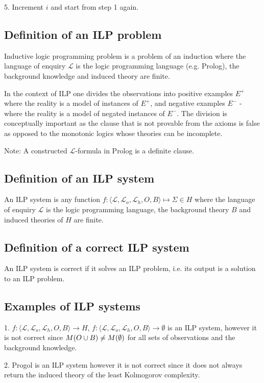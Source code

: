 5. Increment $i$ and start from step 1 again.

\subsection{Definition of an ILP problem}
Inductive logic programming problem is a problem of an induction where the language of enquiry $\mathcal{L}$ is the logic programming language (e.g. Prolog), the background knowledge and induced theory are finite.

In the context of ILP one divides the observations into positive examples $E^+$ where the reality is a model of instances of $E^+$, and negative examples $E^-$ - where the reality is a model of negated instances of $E^-$. The division is conceptually important as the clause that is not provable from the axioms is false as opposed to the monotonic logics whose theories can be incomplete.

Note: A constructed $\mathcal{L}$-formula in Prolog is a definite clause. 

\subsection{Definition of an ILP system}
An ILP system is any function $f:\langle\mathcal{L}, \mathcal{L}_o, \mathcal{L}_h, O, B\rangle \mapsto \Sigma \in H$ where the language of enquiry $\mathcal{L}$ is the logic programming language, the background theory $B$ and induced theories of $H$ are finite.

\subsection{Definition of a correct ILP system}
An ILP system is correct if it solves an ILP problem, i.e. its output is a solution to an ILP problem.

\subsection{Examples of ILP systems}
1. $f:\langle\mathcal{L}, \mathcal{L}_o, \mathcal{L}_h, O, B\rangle \to H$, $f:\langle\mathcal{L}, \mathcal{L}_o, \mathcal{L}_h, O, B\rangle \to \emptyset$ is an ILP system, however it is not correct since $M(O \cup B) \not= M(\emptyset)$ for all sets of observations and the background knowledge.

2. Progol is an ILP system however it is not correct since it does not always return the induced theory of the least Kolmogorov complexity.

